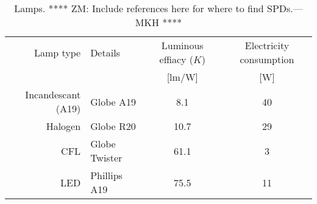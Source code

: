 

\begin{table}
\centering %
\caption{Lamps. **** ZM: Include references here for where to find SPDs.---MKH ****}
\begin{tabular}{r l c c}
  \toprule
  Lamp type 
      & Details 
      & Luminous effiacy ($K$)  
      & Electricity consumption \\
  
      &
      & [lm/W]
      & [W] \\
  \midrule
  Incandescant (A19)    
      & Globe A19
      & 8.1
      & 40 \\
  Halogen
      & Globe R20
      & 10.7
      & 29 \\
  CFL
      & Globe Twister
      & 61.1
      & 3 \\
  LED
      & Phillips A19
      & 75.5
      & 11 \\
  \bottomrule
\end{tabular}
\label{tab:lamps}
\end{table}

